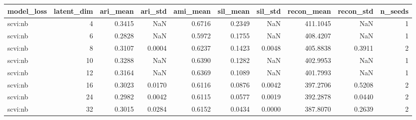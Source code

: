 \begin{tabular}{lrrrrrrrrr}
\toprule
model\_loss & latent\_dim & ari\_mean & ari\_std & ami\_mean & sil\_mean & sil\_std & recon\_mean & recon\_std & n\_seeds \\
\midrule
scvi:nb & 4 & 0.3415 & NaN & 0.6716 & 0.2349 & NaN & 411.1045 & NaN & 1 \\
scvi:nb & 6 & 0.2828 & NaN & 0.5972 & 0.1755 & NaN & 408.4207 & NaN & 1 \\
scvi:nb & 8 & 0.3107 & 0.0004 & 0.6237 & 0.1423 & 0.0048 & 405.8838 & 0.3911 & 2 \\
scvi:nb & 10 & 0.3288 & NaN & 0.6390 & 0.1282 & NaN & 402.9953 & NaN & 1 \\
scvi:nb & 12 & 0.3164 & NaN & 0.6369 & 0.1089 & NaN & 401.7993 & NaN & 1 \\
scvi:nb & 16 & 0.3023 & 0.0170 & 0.6116 & 0.0876 & 0.0042 & 397.2706 & 0.5208 & 2 \\
scvi:nb & 24 & 0.2982 & 0.0042 & 0.6115 & 0.0577 & 0.0019 & 392.2878 & 0.0440 & 2 \\
scvi:nb & 32 & 0.3015 & 0.0284 & 0.6152 & 0.0434 & 0.0000 & 387.8070 & 0.2639 & 2 \\
\bottomrule
\end{tabular}

